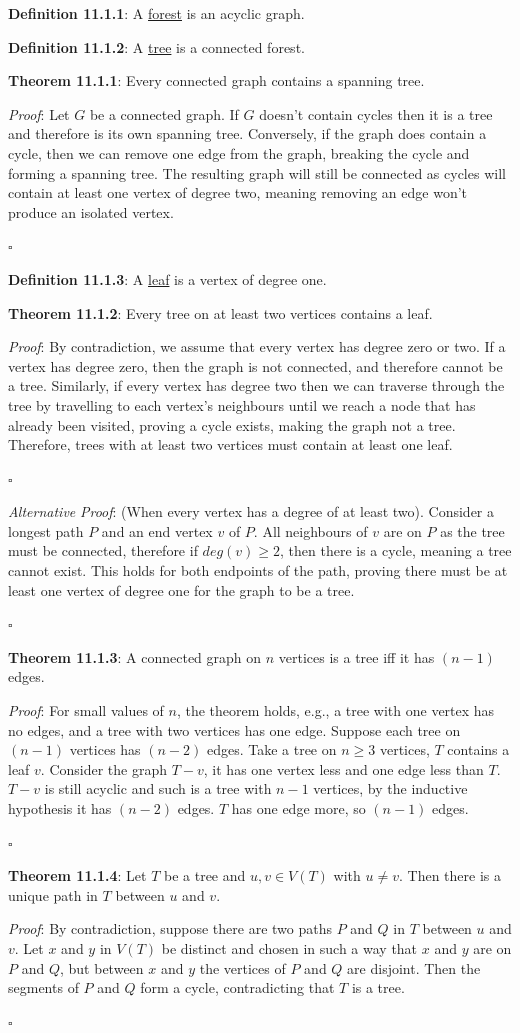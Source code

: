 \documentclass{article}
\newcommand{\separate}[1] {\vspace{#1 pt}\noindent}
\newcommand{\definition}[2]{\textbf{Definition #1}: #2\label{def:#1}}
\newcommand{\proof}[2]{\textit{Proof}: #2 \begin{flushright}\(\square\)\end{flushright}\label{prf:#1}}
\newcommand{\theorem}[3]{\textbf{Theorem #1}: #2 \par\separate{3}\proof{thm:#1}{#3}\label{thm:#1}}
\begin{document}
\definition{11.1.1}{A \underline{forest} is an acyclic graph.}

\separate{7}\definition{11.1.2}{A \underline{tree} is a connected forest.}

\separate{7}\theorem{11.1.1}{Every connected graph contains a spanning tree.}{Let \(G\) be a connected graph. If \(G\) doesn't contain cycles then it is a tree and therefore is its own spanning tree. Conversely, if the graph does contain a cycle, then we can remove one edge from the graph, breaking the cycle and forming a spanning tree. The resulting graph will still be connected as cycles will contain at least one vertex of degree two, meaning removing an edge won't produce an isolated vertex.}

\newpage\noindent\definition{11.1.3}{A \underline{leaf} is a vertex of degree one.}

\separate{7}\theorem{11.1.2}{Every tree on at least two vertices contains a leaf.}{By contradiction, we assume that every vertex has degree zero or two. If a vertex has degree zero, then the graph is not connected, and therefore cannot be a tree. Similarly, if every vertex has degree two then we can traverse through the tree by travelling to each vertex's neighbours until we reach a node that has already been visited, proving a cycle exists, making the graph not a tree. Therefore, trees with at least two vertices must contain at least one leaf.}
\textit{Alternative }\proof{alt:thm:11.1.2}{(When every vertex has a degree of at least two). Consider a longest path \(P\) and an end vertex \(v\) of \(P\). All neighbours of \(v\) are on \(P\) as the tree must be connected, therefore if \(deg(v) \geq 2\), then there is a cycle, meaning a tree cannot exist. This holds for both endpoints of the path, proving there must be at least one vertex of degree one for the graph to be a tree.}

\separate{7}\theorem{11.1.3}{A connected graph on \(n\) vertices is a tree iff it has \((n-1)\) edges.}
{For small values of \(n\), the theorem holds, e.g., a tree with one vertex has no edges, and a tree with two vertices has one edge. Suppose each tree on \((n-1)\) vertices has \((n-2)\) edges. Take a tree on \(n \geq 3\) vertices, \(T\) contains a leaf \(v\). Consider the graph \(T-v\), it has one vertex less and one edge less than \(T\). \(T-v\) is still acyclic and such is a tree with \(n-1\) vertices, by the inductive hypothesis it has \((n-2)\) edges. \(T\) has one edge more, so \((n-1)\) edges.}

\separate{7}\theorem{11.1.4}{Let \(T\) be a tree and \(u,v \in V(T)\) with \(u \neq v\). Then there is a unique path in \(T\) between \(u\) and \(v\).}
{By contradiction, suppose there are two paths \(P\) and \(Q\) in \(T\) between \(u\) and \(v\). Let \(x\) and \(y\) in \(V(T)\) be distinct and chosen in such a way that \(x\) and \(y\) are on \(P\) and \(Q\), but between \(x\) and \(y\) the vertices of \(P\) and \(Q\) are disjoint. Then the segments of \(P\) and \(Q\) form a cycle, contradicting that \(T\) is a tree.}
\end{document}
